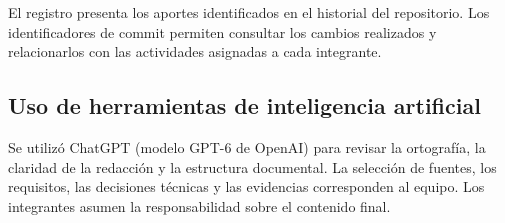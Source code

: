El registro presenta los aportes identificados en el historial del repositorio. Los identificadores de commit permiten consultar los cambios realizados y relacionarlos con las actividades asignadas a cada integrante.


\subsection{Uso de herramientas de inteligencia artificial}
\label{sec:uso-ia}

Se utilizó ChatGPT (modelo GPT-6 de OpenAI) para revisar la ortografía, la claridad de la redacción y la estructura documental. La selección de fuentes, los requisitos, las decisiones técnicas y las evidencias corresponden al equipo. Los integrantes asumen la responsabilidad sobre el contenido final.

